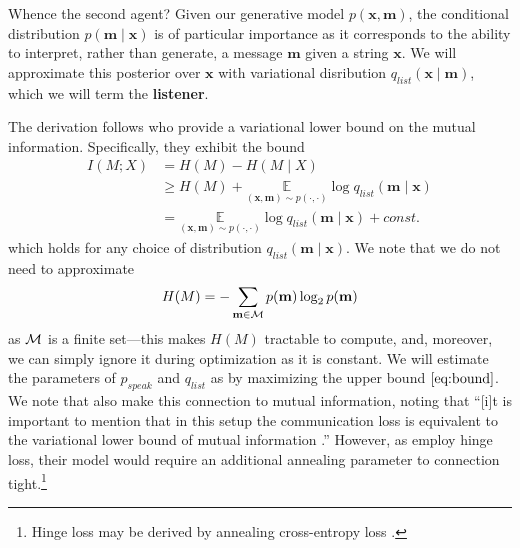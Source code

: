 \documentclass[11pt,a4paper]{article}
\newcommand{\xx}{\mathbf{x}}
\newcommand{\mm}{\mathbf{m}}
\newcommand{\qlist}{q_{\textit{list}}}
\newcommand{\pspeak}{p_{\textit{speak}}}
\newcommand{\defn}[1]{\textbf{#1}}
\newcommand{\calM}{{\cal M}}
\begin{document}
Whence the second agent? Given our generative model $p(\xx, \mm)$, the conditional distribution $p(\mm \mid \xx)$ is of particular importance as it corresponds to the ability to interpret, rather than generate, a message $\mm$ given a string $\xx$. We will approximate this posterior over $\xx$ with variational disribution $\qlist(\xx \mid \mm)$, which we will term the \defn{listener}. 

The derivation follows  who provide a variational lower bound on the mutual information. Specifically, they exhibit the bound
\begin{align}
    I(M; X) &= H(M) - H(M \mid X) \label{eq:bound} \\
            &\geq H(M) + \underset{(\xx, \mm) \sim p(\cdot, \cdot)}{\mathbb{E}} \log \qlist(\mm \mid \xx) \nonumber \\
             &= \underset{(\xx, \mm) \sim p(\cdot, \cdot)}{\mathbb{E}} \log \qlist(\mm \mid \xx) + \textit{const.} \nonumber
\end{align}
which holds for any choice of distribution $\qlist(\mm \mid \xx)$. We note that we do not need to approximate \begin{equation}
H(M) = -\sum_{\mm \in \calM} p(\mm) \log_2 p(\mm)
\end{equation}
as $\calM$ is a finite set---this makes $H(M)$ tractable to compute, and, moreover, we can simply ignore it during optimization as it is constant. We will estimate the parameters of $\pspeak$ and $\qlist$ as by maximizing the upper bound $\cref{eq:bound}$. We note that  also make this connection to mutual information, noting that ``[i]t is important to mention that in this setup the communication loss is equivalent to the variational lower bound of mutual information \cite{agakov2004algorithm}.'' However, as  employ hinge loss, their model would require an additional annealing parameter to connection tight.\footnote{Hinge loss may be derived by annealing cross-entropy loss \cite{martins}. }

\end{document}
